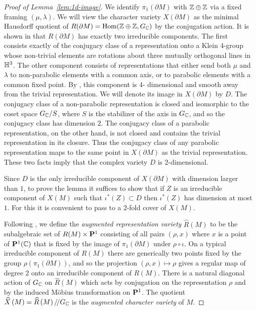 \documentclass[tikz, sepfignums, defaultenums]{nmd/article}
\newcommand{\augcharvar}[1]{\widehat{X}\left(#1\right)}
\newcommand{\augrepvar}[1]{\widehat{R}\left(#1\right)}
\newcommand{\GC}{G_\C}
\newcommand{\sslash}{/\mkern-3mu/}
\newcommand{\inc}{\iota}
\newcommand{\Pone}{\P^1(\C)}
\begin{document}
\begin{proof}[Proof of Lemma~\ref{lem:1d-image}]

We identify $\pi_1(\partial M)$ with $\Z\oplus\Z$ via a fixed framing
$(\mu, \lambda)$.  We will view the character variety $X(\partial M)$
as the minimal Hausdorff quotient of
$R(\partial M) = \Hom(\Z\oplus\Z, \GC)$ by the conjugation action.  It
is shown in \cite[Lemma~7.4]{HeusenerPorti2005} that $R(\partial M)$
has exactly two irreducible components.  The first consists exactly of
the conjugacy class of a representation onto a Klein $4$-group whose
non-trivial elements are rotations about three mutually orthogonal
lines in $\H^3$.  The other component consists of representations that
either send both $\mu$ and $\lambda$ to non-parabolic elements with a
common axis, or to parabolic elements with a common fixed point.  By
\cite[Lemma~7.4]{HeusenerPorti2005}, this component is 4\hyp
dimensional and smooth away from the trivial representation.  We will
denote its image in $X(\partial M)$ by $D$.  The conjugacy class of a
non-parabolic representation is closed and isomorphic to the coset
space $\GC/S$, where $S$ is the stabilizer of the axis in $\GC$, and
so the conjugacy class has dimension $2$.  The conjugacy class of a
parabolic representation, on the other hand, is not closed and
contains the trivial representation in its closure.  Thus the
conjugacy class of any parabolic representation maps to the same point
in $X(\partial M)$ as the trivial representation.  These two facts
imply that the complex variety $D$ is $2$-dimensional.

Since $D$ is the only irreducible component of $X(\partial M)$ with
dimension larger than $1$, to prove the lemma it suffices to show that
if $Z$ is an irreducible component of $X(M)$ such that
$\inc^*(Z)\subset D$ then $\inc^*(Z)$ has dimension at most $1$.  For this it
is convenient to pass to a $2$-fold cover of $X(M)$.

Following \cite{Dunfield2003}, we define the \emph{augmented
  representation variety} $\augrepvar{M}$ to be the subalgebraic set
of $R(M) \times \P^1$ consisting of all pairs $(\rho, x)$ where $x$ is
a point of $\Pone$ that is fixed by the image of
$\pi_1(\partial M)$ under $\rho\circ\inc$.  On a typical irreducible
component of $R(M)$ there are generically two points fixed by the
group $\rho(\pi_1(\partial M))$, and so the projection
$(\rho, x) \mapsto \rho$ gives a regular map of degree $2$ onto an
irreducible component of $R(M)$.  There is a natural diagonal action
of $\GC$ on $\augrepvar{M}$ which acts by conjugation on the
representation $\rho$ and by the induced M\"obius transformation on
$\P^1$.  The quotient
$\augcharvar{M} = \augrepvar{M}\sslash\GC$ is the
\emph{augmented character variety} of $M$.


\end{proof}
\end{document}

